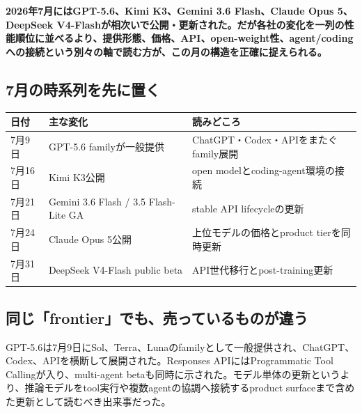 \noindent\textbf{2026年7月にはGPT-5.6、Kimi K3、Gemini 3.6 Flash、Claude Opus 5、DeepSeek V4-Flashが相次いで公開・更新された。だが各社の変化を一列の性能順位に並べるより、提供形態、価格、API、open-weight性、agent/codingへの接続という別々の軸で読む方が、この月の構造を正確に捉えられる。}\autocite{src-9191d43918fc,src-a24fd97eb3d0,src-e19fbb75eb44,src-e547d0d8cbe3,src-f6aa679babd7}

\par\medskip
\subsection{7月の時系列を先に置く}

\begin{center}
\small
\begin{tabularx}{\columnwidth}{>{\raggedright\arraybackslash}X|>{\raggedright\arraybackslash}X|>{\raggedright\arraybackslash}X}
\toprule
\textbf{日付} & \textbf{主な変化} & \textbf{読みどころ} \\
\midrule
7月9日 & GPT-5.6 familyが一般提供 & ChatGPT・Codex・APIをまたぐfamily展開 \\
7月16日 & Kimi K3公開 & open modelとcoding-agent環境の接続 \\
7月21日 & Gemini 3.6 Flash / 3.5 Flash-Lite GA & stable API lifecycleの更新 \\
7月24日 & Claude Opus 5公開 & 上位モデルの価格とproduct tierを同時更新 \\
7月31日 & DeepSeek V4-Flash public beta & API世代移行とpost-training更新 \\
\bottomrule
\end{tabularx}
\autocite{src-9191d43918fc,src-a24fd97eb3d0,src-e19fbb75eb44,src-e547d0d8cbe3,src-f6aa679babd7}
\end{center}

\par\medskip
\subsection{同じ「frontier」でも、売っているものが違う}

GPT-5.6は7月9日にSol、Terra、Lunaのfamilyとして一般提供され、ChatGPT、Codex、APIを横断して展開された。Responses APIにはProgrammatic Tool Callingが入り、multi-agent betaも同時に示された。モデル単体の更新というより、推論モデルをtool実行や複数agentの協調へ接続するproduct surfaceまで含めた更新として読むべき出来事だった。\autocite{src-e19fbb75eb44}


